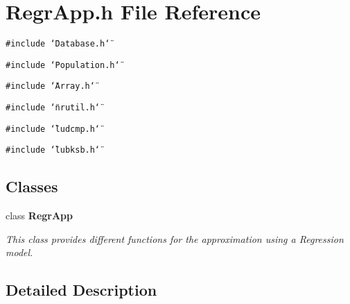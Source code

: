 \section{Regr\-App.h File Reference}
\label{RegrApp_8h}
{\tt \#include \char`\"{}Database.h\char`\"{}}\par
{\tt \#include \char`\"{}Population.h\char`\"{}}\par
{\tt \#include \char`\"{}Array.h\char`\"{}}\par
{\tt \#include \char`\"{}nrutil.h\char`\"{}}\par
{\tt \#include \char`\"{}ludcmp.h\char`\"{}}\par
{\tt \#include \char`\"{}lubksb.h\char`\"{}}\par
\subsection*{Classes}
\begin{CompactItemize}
\item 
class {\bf Regr\-App}
\begin{CompactList}\small\item\em This class provides different functions for the approximation using a Regression model. \item\end{CompactList}\end{CompactItemize}


\subsection{Detailed Description}
